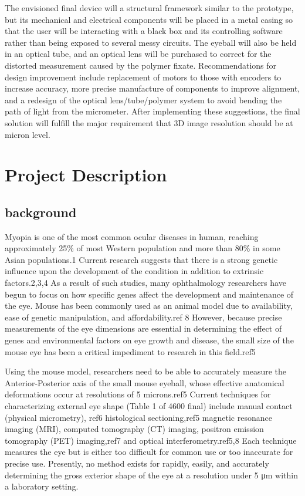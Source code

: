 \documentclass{article}
\begin{document}
The envisioned final device will a structural framework similar to the prototype, but its mechanical and electrical components will be placed in a metal casing so that the user will be interacting with a black box and its controlling software rather than being exposed to several messy circuits. The eyeball will also be held in an optical tube, and an optical lens will be purchased to correct for the distorted measurement caused by the polymer fixate. Recommendations for design improvement include replacement of motors to those with encoders to increase accuracy, more precise manufacture of components to improve alignment, and a redesign of the optical lens/tube/polymer system to avoid bending the path of light from the micrometer. After implementing these suggestions, the final 
solution will fulfill the major requirement that 3D image resolution should be at micron 
level. 


\newpage

\section{Project Description}
\label{sec:project-description}

\subsection{background}
\label{sec:background}
Myopia is one of the most common ocular diseases in human, reaching approximately 25\% of most Western population and more than 80\% in some Asian populations.\cite{rajan98}1 Current research suggests that there is a strong genetic influence upon the development of the condition in addition to extrinsic factors.\cite{zhou99:genes,zhou99:models,schmucker04}2,3,4 As a result of such studies, many ophthalmology researchers have begun to focus on how specific genes affect the development and maintenance of the eye. Mouse has been commonly used as an animal model due to availability, ease of genetic manipulation, and affordability.\cite{schaeffel04}ref 8  However, because precise measurements of the eye dimensions are essential in determining the effect of genes and environmental factors on eye growth and disease, the small size of the mouse eye has been a critical impediment to research in this field.\cite{schaeffel04}ref5 
 
Using the mouse model, researchers need to be able to accurately measure the Anterior-Posterior axis of the small mouse eyeball, whose effective anatomical deformations occur at resolutions of 5 microns.\cite{schaeffel04}ref5  Current techniques for characterizing external eye shape (Table 1 of 4600 final) include manual contact (physical micrometry),\cite{wallman04} ref6 histological sectioning,\cite{schaeffel04}ref5 magnetic resonance imaging (MRI), computed tomography (CT) imaging, positron emission tomography (PET) imaging,\cite{atchison04}ref7 and optical interferometry.\cite{schaeffel04,guggenheim04}ref5,8 Each technique measures the eye but is either too difficult for common use or too inaccurate for precise use. Presently, no method exists for rapidly, easily, and accurately determining the gross exterior shape of the eye at a resolution under 5 μm within a laboratory setting. 
\end{document}

